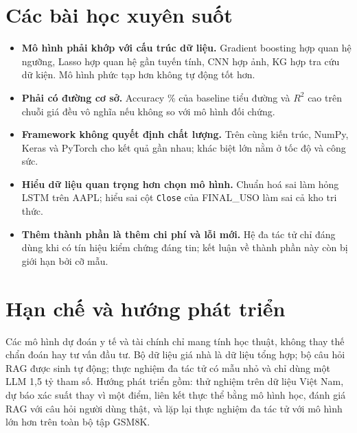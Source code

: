 \section*{Các bài học xuyên suốt}
\begin{itemize}
  \item \textbf{Mô hình phải khớp với cấu trúc dữ liệu.} Gradient boosting hợp quan hệ ngưỡng, Lasso hợp quan hệ gần tuyến tính, CNN hợp ảnh, KG hợp tra cứu dữ kiện. Mô hình phức tạp hơn không tự động tốt hơn.
  \item \textbf{Phải có đường cơ sở.} Accuracy \% của baseline tiểu đường và $R^2$ cao trên chuỗi giá đều vô nghĩa nếu không so với mô hình đối chứng.
  \item \textbf{Framework không quyết định chất lượng.} Trên cùng kiến trúc, NumPy, Keras và PyTorch cho kết quả gần nhau; khác biệt lớn nằm ở tốc độ và công sức.
  \item \textbf{Hiểu dữ liệu quan trọng hơn chọn mô hình.} Chuẩn hoá sai làm hỏng LSTM trên AAPL; hiểu sai cột \texttt{Close} của FINAL\_USO làm sai cả kho tri thức.
  \item \textbf{Thêm thành phần là thêm chi phí và lỗi mới.} Hệ đa tác tử chỉ đáng dùng khi có tín hiệu kiểm chứng đáng tin; kết luận về thành phần này còn bị giới hạn bởi cỡ mẫu.
\end{itemize}

\section*{Hạn chế và hướng phát triển}
Các mô hình dự đoán y tế và tài chính chỉ mang tính học thuật, không thay thế chẩn đoán hay tư vấn đầu tư. Bộ dữ liệu giá nhà là dữ liệu tổng hợp; bộ câu hỏi RAG được sinh tự động; thực nghiệm đa tác tử có mẫu nhỏ và chỉ dùng một LLM 1,5 tỷ tham số. Hướng phát triển gồm: thử nghiệm trên dữ liệu Việt Nam, dự báo xác suất thay vì một điểm, liên kết thực thể bằng mô hình học, đánh giá RAG với câu hỏi người dùng thật, và lặp lại thực nghiệm đa tác tử với mô hình lớn hơn trên toàn bộ tập GSM8K.
